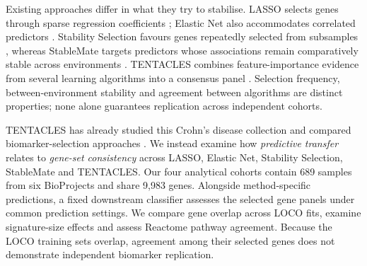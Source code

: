 Existing approaches differ in what they try to stabilise. LASSO selects genes through sparse regression coefficients \cite{tibshirani1996lasso}; Elastic Net also accommodates correlated predictors \cite{zou2005elastic}. Stability Selection favours genes repeatedly selected from subsamples \cite{meinshausen2010stability}, whereas StableMate targets predictors whose associations remain comparatively stable across environments \cite{deng2024stablemate}. TENTACLES combines feature-importance evidence from several learning algorithms into a consensus panel \cite{montesi2026tentacles}. Selection frequency, between-environment stability and agreement between algorithms are distinct properties; none alone guarantees replication across independent cohorts.

TENTACLES has already studied this Crohn's disease collection and compared biomarker-selection approaches \cite{montesi2026tentacles}. We instead examine how \emph{predictive transfer} relates to \emph{gene-set consistency} across LASSO, Elastic Net, Stability Selection, StableMate and TENTACLES. Our four analytical cohorts contain 689 samples from six BioProjects and share 9,983 genes. Alongside method-specific predictions, a fixed downstream classifier assesses the selected gene panels under common prediction settings. We compare gene overlap across LOCO fits, examine signature-size effects and assess Reactome pathway agreement. Because the LOCO training sets overlap, agreement among their selected genes does not demonstrate independent biomarker replication.
